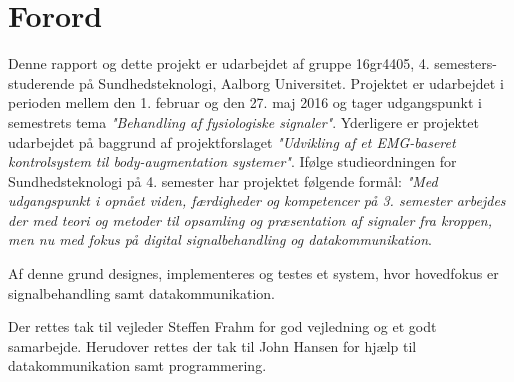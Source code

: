 \section{Forord}
Denne rapport og dette projekt er udarbejdet af gruppe 16gr4405, 4. semesters-studerende på Sundhedsteknologi, Aalborg Universitet. Projektet er udarbejdet i perioden mellem den 1. februar og den 27. maj 2016 og tager udgangspunkt i semestrets tema \textit{"Behandling af fysiologiske signaler"}. Yderligere er projektet udarbejdet på baggrund af projektforslaget \textit{"Udvikling af et EMG-baseret kontrolsystem til body-augmentation systemer"}. Ifølge studieordningen for Sundhedsteknologi på 4. semester har projektet følgende formål: \textit{"Med udgangspunkt i opnået viden, færdigheder og kompetencer på 3. semester arbejdes der med teori og metoder til opsamling og præsentation af signaler fra kroppen, men nu med fokus på digital signalbehandling og datakommunikation}. \citep{aalborguniversitet2014}

Af denne grund designes, implementeres og testes et system, hvor hovedfokus er signalbehandling samt datakommunikation. 

Der rettes tak til vejleder Steffen Frahm for god vejledning og et godt samarbejde. Herudover rettes der tak til John Hansen for hjælp til datakommunikation samt programmering. 